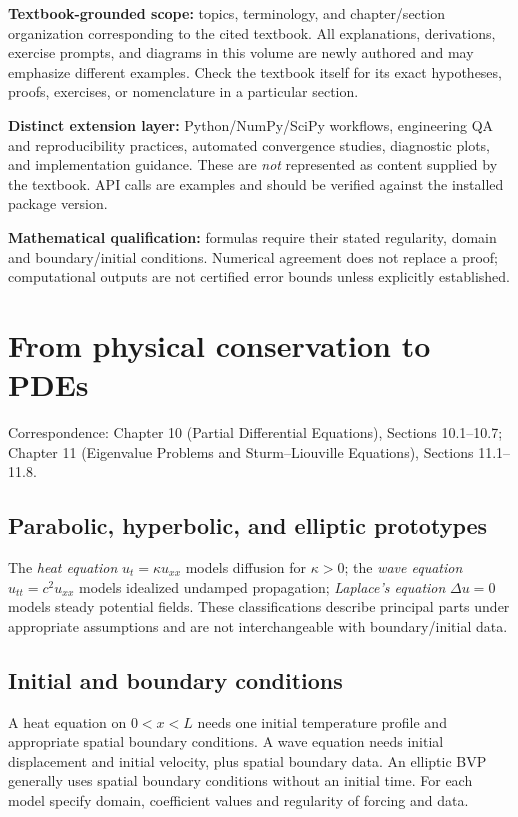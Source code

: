 \documentclass[11pt,letterpaper,oneside]{report}
\theoremstyle{definition}\newtheorem{definition}[theorem]{Definition}
\theoremstyle{remark}\newtheorem{remark}[theorem]{Remark}
\begin{document}
\begin{bookground}
\textbf{Textbook-grounded scope:} topics, terminology, and chapter/section organization corresponding to the cited textbook. All explanations, derivations, exercise prompts, and diagrams in this volume are newly authored and may emphasize different examples. Check the textbook itself for its exact hypotheses, proofs, exercises, or nomenclature in a particular section.
\end{bookground}
\begin{modern}
\textbf{Distinct extension layer:} Python/NumPy/SciPy workflows, engineering QA and reproducibility practices, automated convergence studies, diagnostic plots, and implementation guidance. These are \emph{not} represented as content supplied by the textbook. API calls are examples and should be verified against the installed package version.
\end{modern}
\begin{caution}
\textbf{Mathematical qualification:} formulas require their stated regularity, domain and boundary/initial conditions. Numerical agreement does not replace a proof; computational outputs are not certified error bounds unless explicitly established.
\end{caution}
\tableofcontents\clearpage{}
\chapter{From physical conservation to PDEs}
\begin{bookground}Correspondence: Chapter 10 (Partial Differential Equations), Sections 10.1--10.7; Chapter 11 (Eigenvalue Problems and Sturm--Liouville Equations), Sections 11.1--11.8.\end{bookground}
\section{Parabolic, hyperbolic, and elliptic prototypes}
The \emph{heat equation} $u_t=\kappa u_{xx}$ models diffusion for $\kappa>0$; the \emph{wave equation} $u_{tt}=c^2u_{xx}$ models idealized undamped propagation; \emph{Laplace's equation} $\Delta u=0$ models steady potential fields. These classifications describe principal parts under appropriate assumptions and are not interchangeable with boundary/initial data.
\section{Initial and boundary conditions}
A heat equation on $0<x<L$ needs one initial temperature profile and appropriate spatial boundary conditions. A wave equation needs initial displacement and initial velocity, plus spatial boundary data. An elliptic BVP generally uses spatial boundary conditions without an initial time. For each model specify domain, coefficient values and regularity of forcing and data.
\end{document}

